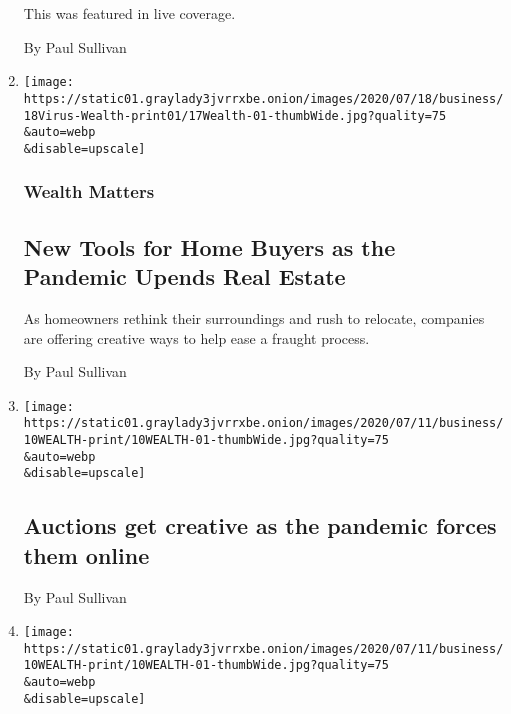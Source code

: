 \begin{enumerate}
  This was featured in live coverage.

  By Paul Sullivan
\item
  \href{/2020/07/17/your-money/real-estate-relocation-coronavirus.html}{}

  \texttt{[image: https://static01.graylady3jvrrxbe.onion/images/2020/07/18/business/18Virus-Wealth-print01/17Wealth-01-thumbWide.jpg?quality=75\\\&auto=webp\\\&disable=upscale]}

  \hypertarget{wealth-matters-4}{%
  \subsubsection{Wealth Matters}\label{wealth-matters-4}}

  \hypertarget{new-tools-for-home-buyers-as-the-pandemic-upends-real-estate}{%
  \subsection{New Tools for Home Buyers as the Pandemic Upends Real
  Estate}\label{new-tools-for-home-buyers-as-the-pandemic-upends-real-estate}}

  As homeowners rethink their surroundings and rush to relocate,
  companies are offering creative ways to help ease a fraught process.

  By Paul Sullivan
\item
  \href{/2020/07/10/business/auctions-get-creative-as-the-pandemic-forces-them-online.html}{}

  \texttt{[image: https://static01.graylady3jvrrxbe.onion/images/2020/07/11/business/10WEALTH-print/10WEALTH-01-thumbWide.jpg?quality=75\\\&auto=webp\\\&disable=upscale]}

  \hypertarget{auctions-get-creative-as-the-pandemic-forces-them-online}{%
  \subsection{Auctions get creative as the pandemic forces them
  online}\label{auctions-get-creative-as-the-pandemic-forces-them-online}}

  By Paul Sullivan
\item
  \href{/2020/07/10/your-money/auctions-wealth-coronavirus.html}{}

  \texttt{[image: https://static01.graylady3jvrrxbe.onion/images/2020/07/11/business/10WEALTH-print/10WEALTH-01-thumbWide.jpg?quality=75\\\&auto=webp\\\&disable=upscale]}

  \hypertarget{wealth-matters-5}{%
}
\end{enumerate}
